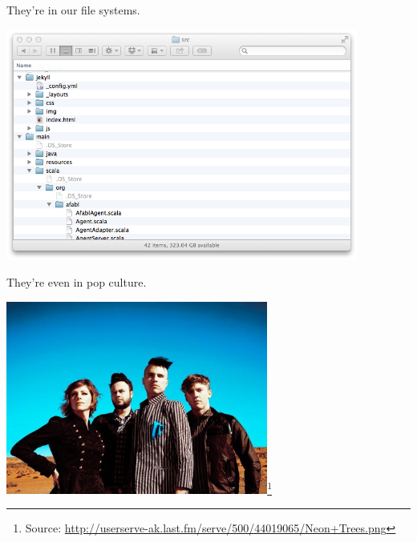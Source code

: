 \documentclass{beamer}
\begin{document}
\begin{frame}[fragile]{}

They're in our file systems.

\begin{center}
\includegraphics[height=3in]{directory-tree.png}
\end{center}

\end{frame}


\begin{frame}[fragile]{}

They're even in pop culture.

\begin{center}
\includegraphics[height=2.5in]{Neon+Trees.png}\footnote{Source: \url{http://userserve-ak.last.fm/serve/500/44019065/Neon+Trees.png}}
\end{center}

\end{frame}
\end{document}
